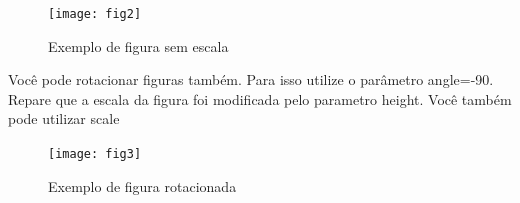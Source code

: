 \documentclass[	DIV=calc,%
							paper=a4,%
							fontsize=12pt,%
							onecolumn]{scrartcl}	 					%
\begin{document}
\begin{figure}
	\centering
	\texttt{[image: fig2]}
	\caption{Exemplo de figura sem escala}
	\label{fig2}
\end{figure}

Você pode rotacionar figuras também. Para isso utilize o parâmetro angle=-90. Repare que a escala da figura foi modificada pelo parametro height. Você também pode utilizar scale

\begin{figure}
	\centering
	\texttt{[image: fig3]}
	\caption{Exemplo de figura rotacionada}
	\label{fig3}
\end{figure}


\end{document}
